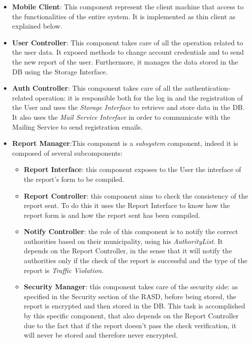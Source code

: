 \documentclass{report}
\begin{document}
\begin{itemize}
    
\item \textbf{Mobile Client}: This component represent the client machine that access to the functionalities of the entire system. It is implemented as thin client as explained below.

\item \textbf{User Controller}: This component takes care of all the operation related to the user data. It exposed methods to change account credentials and to send the new report of the user. Furthermore, it manages the data stored in the
DB using the Storage Interface.
\item \textbf{Auth Controller}: This component takes care of all the authentication-related operation: it is responsible both for the log in and the registration of the User and uses the \textit{Storage Interface} to retrieve and store data in the DB. It also uses the \textit{Mail Service Interface} in order to communicate with the Mailing Service to send registration emails.   
\item \textbf{Report Manager}:This component is a \textit{subsystem} component, indeed it is composed of several subcomponents:
\begin{itemize}
    \item \textbf{Report Interface}: this component exposes to the User the interface of the report's form to be compiled.
    \item \textbf{Report Controller}: this component aims to check the consistency of the report sent. To do this it uses the Report Interface to know how the report form is and how the report sent has been compiled.
    \item \textbf{Notify Controller}: the role of this component is to notify the correct authorities based on their municipality, using his \textit{AuthorityList}. It depends on the Report Controller, in the sense that it will notify the authorities only if the check of the report is successful and the type of the report is \textit{Traffic Violation}.
    \item \textbf{Security Manager}: this component takes care of the security side: as specified in the Security section of the RASD, before being stored, the report is encrypted and then stored in the DB. This task is accomplished by this specific component, that also depends on the Report Controller due to the fact that if the report doesn't pass the check verification, it will never be stored and therefore never encrypted.
\end{itemize}
\end{itemize}
\end{document}
